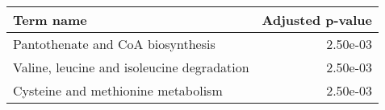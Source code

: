 \begin{tabular}{lr}
\toprule
                                 Term name &  Adjusted p-value \\
\midrule
         Pantothenate and CoA biosynthesis &          2.50e-03 \\
Valine, leucine and isoleucine degradation &          2.50e-03 \\
        Cysteine and methionine metabolism &          2.50e-03 \\
\bottomrule
\end{tabular}
